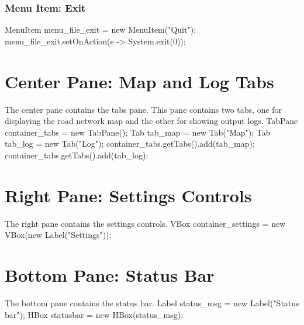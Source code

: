 \documentclass{article}
\def\nwendcode{\endtrivlist \endgroup}      %
\let\nwdocspar=\par
\begin{document}
\subsubsection{Menu Item: Exit}
\nwenddocs{}\endmoddef{}
MenuItem menu_file_exit = new MenuItem("Quit");
menu_file_exit.setOnAction(e -> System.exit(0));
\nwendcode{}\nwdocspar

\section{Center Pane: Map and Log Tabs}
The center pane contains the tabs pane. This pane contains two tabs, one for
displaying the road network map and the other for showing output logs.
\nwenddocs{}\endmoddef{}
TabPane container_tabs = new TabPane();
Tab tab_map = new Tab("Map");
Tab tab_log = new Tab("Log");
container_tabs.getTabs().add(tab_map);
container_tabs.getTabs().add(tab_log);
\nwendcode{}\nwdocspar

\section{Right Pane: Settings Controls}
The right pane contains the settings controls.
\nwenddocs{}\endmoddef{}
VBox container_settings = new VBox(new Label("Settings"));
\nwendcode{}\nwdocspar

\section{Bottom Pane: Status Bar}
The bottom pane contains the status bar.
\nwenddocs{}\endmoddef{}
Label status_msg = new Label("Status bar");
HBox statusbar = new HBox(status_msg);
\nwendcode{}\nwdocspar
\end{document}
